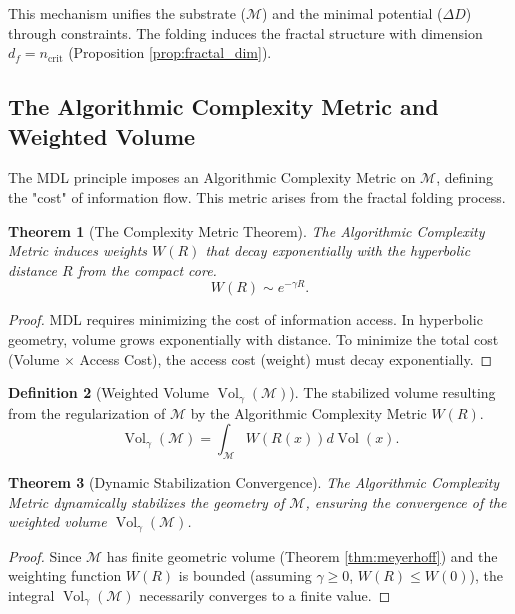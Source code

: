 \documentclass[11pt, a4paper]{article}
\newtheorem{theorem}{Theorem}[section]
\theoremstyle{definition}
\newtheorem{definition}[theorem]{Definition}
\theoremstyle{definition}
\newcommand{\M}{\mathcal{M}}
\newcommand{\Vol}{\operatorname{Vol}}
\newcommand{\df}{d_f} %
\newcommand{\VolGamma}{\Vol_{\gamma}}
\newcommand{\ncrit}{n_{\mathrm{crit}}}
\begin{document}
This mechanism unifies the substrate ($\M$) and the minimal potential ($\Delta D$) through constraints. The folding induces the fractal structure with dimension $\df = \ncrit$ (Proposition \ref{prop:fractal_dim}).

\subsection{The Algorithmic Complexity Metric and Weighted Volume}

The MDL principle imposes an Algorithmic Complexity Metric on $\M$, defining the "cost" of information flow. This metric arises from the fractal folding process.

\begin{theorem}[The Complexity Metric Theorem]
The Algorithmic Complexity Metric induces weights $W(R)$ that decay exponentially with the hyperbolic distance $R$ from the compact core.
\begin{equation}
    W(R) \sim e^{-\gamma R}.
\end{equation}
\end{theorem}
\begin{proof}
MDL requires minimizing the cost of information access. In hyperbolic geometry, volume grows exponentially with distance. To minimize the total cost (Volume $\times$ Access Cost), the access cost (weight) must decay exponentially.
\end{proof}

\begin{definition}[Weighted Volume $\VolGamma(\M)$]\label{def:weighted_volume}
The stabilized volume resulting from the regularization of $\M$ by the Algorithmic Complexity Metric $W(R)$.
\begin{equation}
    \VolGamma(\M) = \int_{\M} W(R(x)) d\Vol(x).
\end{equation}
\end{definition}

\begin{theorem}[Dynamic Stabilization Convergence]\label{thm:regularization_convergence}
The Algorithmic Complexity Metric dynamically stabilizes the geometry of $\M$, ensuring the convergence of the weighted volume $\VolGamma(\M)$.
\end{theorem}
\begin{proof}
Since $\M$ has finite geometric volume (Theorem \ref{thm:meyerhoff}) and the weighting function $W(R)$ is bounded (assuming $\gamma \ge 0$, $W(R) \le W(0)$), the integral $\VolGamma(\M)$ necessarily converges to a finite value.
\end{proof}
\end{document}
